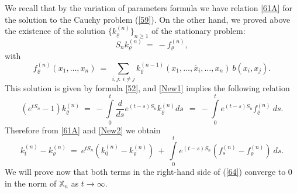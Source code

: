 \documentclass[a4paper,12pt]{article}
\newcommand{\XX}{{\mathbb X}}
\begin{document}


We recall that by the variation of parameters formula we have relation \eqref{61A} for the solution to the Cauchy problem (\ref{59}).
On the other hand, we proved above the existence of the solution $\{ k_{\varrho}^{(n)} \}_{n\geq 1}$ of the stationary problem:
\begin{equation}\label{New1}
S_n  k_\varrho^{(n)} \ = \ - f_\varrho^{(n)},
\end{equation}
with
$$
f_\varrho^{(n)}(x_1, \ldots, x_n) \ = \ \sum_{i,j:\ i\neq j}
k_\varrho^{(n-1)}(x_1, \ldots,\check{x_i}, \ldots, x_n) \ b(x_i, x_j).
$$
This solution is given by formula \eqref{52}, and
\eqref{New1} implies the following relation
\begin{equation}\label{New2}
\left( e^{t S_n} -  1 \right) k_\varrho^{(n)} \ = \ -
\int\limits_0^t \frac{d}{ds} e^{(t-s) S_n} k_\varrho^{(n)} ds \
\ = \ - \int\limits_0^t e^{(t-s) S_n}  f_\varrho^{(n)} \ ds.
\end{equation}
Therefore from \eqref{61A} and \eqref{New2} we obtain
\begin{equation}\label{64}
k_{t}^{(n)} -  k_\varrho^{(n)} \ = \
e^{t S_n}(k_{0}^{(n)} - k_\varrho^{(n)}) \ + \  \int\limits_0^t
e^{(t-s) S_n} (f_{s}^{(n)} -  f_\varrho^{(n)}) \ ds.
\end{equation}
We will prove now that both terms in the right-hand side of (\ref{64}) converge to 0 in
the norm of $\XX_n$ as $t \to \infty$.
\end{document}
